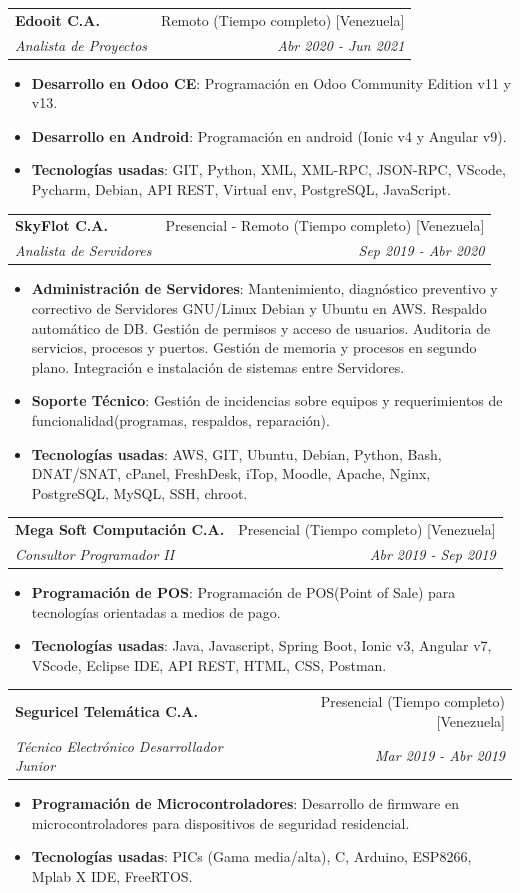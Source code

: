 \documentclass[a4paper,20pt]{article}
\makeatletter
\newcommand{\resumeItem}[2]{
  \item\small{
    \textbf{#1}{: #2 \vspace{-2pt}}
  }
}
\newcommand{\resumeSubheading}[4]{
  \vspace{-1pt}\item
    \begin{tabular*}{0.97\textwidth}{l@{\extracolsep{\fill}}r}
      \textbf{#1} & #2 \\
      \textit{#3} & \textit{#4} \\
    \end{tabular*}\vspace{-5pt}
}
\newcommand{\resumeItemListStart}{\begin{itemize}}
\newcommand{\resumeItemListEnd}{\end{itemize}\vspace{-5pt}}
\makeatother
\begin{document}
    \resumeSubheading{Edooit C.A.}{Remoto (Tiempo completo) [Venezuela]}
    {Analista de Proyectos}{Abr 2020 - Jun 2021}
    \resumeItemListStart
        \resumeItem{Desarrollo en Odoo CE}
          {Programación en Odoo Community Edition v11 y v13.}
          \resumeItem{Desarrollo en Android}
          {Programación en android (Ionic v4 y Angular v9).}
          \resumeItem{Tecnologías usadas}{GIT, Python, XML, XML-RPC, JSON-RPC, VScode, Pycharm, Debian, API REST, Virtual env, PostgreSQL, JavaScript.}
      \resumeItemListEnd
\vspace{10pt}
    \resumeSubheading
		{SkyFlot C.A.}{Presencial - Remoto (Tiempo completo) [Venezuela]}
		{Analista de Servidores}{Sep 2019 -  Abr 2020}
		\resumeItemListStart
        \resumeItem{Administración de Servidores}
          {Mantenimiento, diagnóstico preventivo y correctivo de Servidores GNU/Linux Debian y Ubuntu en AWS. Respaldo automático de DB. Gestión de permisos y acceso de usuarios. Auditoria de servicios, procesos y puertos. Gestión de memoria y procesos en segundo plano. Integración e instalación de sistemas entre Servidores.}
        \resumeItem{Soporte Técnico}
           {Gestión de incidencias sobre equipos y requerimientos de funcionalidad(programas, respaldos, reparación).}
        \resumeItem{Tecnologías usadas}{AWS, GIT, Ubuntu, Debian, Python, Bash, DNAT/SNAT, cPanel, FreshDesk, iTop, Moodle, Apache, Nginx, PostgreSQL, MySQL, SSH, chroot.}
		\resumeItemListEnd
		
\vspace{10pt}
    \resumeSubheading
		{Mega Soft Computación C.A.}{Presencial (Tiempo completo) [Venezuela]}
		{Consultor Programador II}{Abr 2019 -  Sep 2019}
\resumeItemListStart
        \resumeItem{Programación de POS}
          {Programación de POS(Point of Sale) para tecnologías orientadas a medios de pago.}
          \resumeItem{Tecnologías usadas}{Java, Javascript, Spring Boot, Ionic v3, Angular v7, VScode, Eclipse IDE, API REST, HTML, CSS, Postman.}
      \resumeItemListEnd
\vspace{10pt}
    \resumeSubheading
		{Seguricel Telemática C.A.}{Presencial (Tiempo completo) [Venezuela]}
		{Técnico Electrónico Desarrollador Junior}{Mar 2019 -  Abr 2019}
\resumeItemListStart
        \resumeItem{Programación de Microcontroladores}
          {Desarrollo de firmware en microcontroladores para dispositivos de seguridad residencial.}
          \resumeItem{Tecnologías usadas}{PICs (Gama media/alta), C, Arduino, ESP8266, Mplab X IDE, FreeRTOS.}
      \resumeItemListEnd
      
\end{document}
